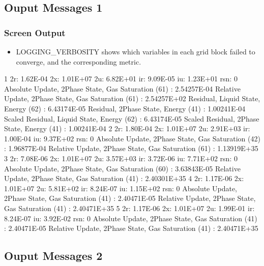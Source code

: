 \documentclass{beamer}
\newcommand\redcomment[1]{{{\color{red} #1}}}
\begin{document}
\subsection{Ouput Messages 1}

\begin{frame}[fragile]\frametitle{Screen Output}

\begin{itemize}
\item \redcomment{LOGGING\_VERBOSITY} shows which variables in each grid block failed to converge, and the corresponding metric. 
\end{itemize}

\begin{semiverbatim}
\tiny
1 2r: 1.62E-04 2x: 1.01E+07 2u: 6.82E+01 ir: 9.09E-05 iu: 1.23E+01 rsn:   0
   Absolute Update, 2Phase State, Gas Saturation (61) : 2.54257E-04
   Relative Update, 2Phase State, Gas Saturation (61) : 2.54257E+02
   Residual, Liquid State, Energy (62) : 6.43174E-05
   Residual, 2Phase State, Energy (41) : 1.00241E-04
   Scaled Residual, Liquid State, Energy (62) : 6.43174E-05
   Scaled Residual, 2Phase State, Energy (41) : 1.00241E-04
  2 2r: 1.80E-04 2x: 1.01E+07 2u: 2.91E+03 ir: 1.00E-04 iu: 9.37E+02 rsn:   0
   Absolute Update, 2Phase State, Gas Saturation (42) : 1.96877E-04
   Relative Update, 2Phase State, Gas Saturation (61) : 1.13919E+35
  3 2r: 7.08E-06 2x: 1.01E+07 2u: 3.57E+03 ir: 3.72E-06 iu: 7.71E+02 rsn:   0
   Absolute Update, 2Phase State, Gas Saturation (60) : 3.63843E-05
   Relative Update, 2Phase State, Gas Saturation (41) : 2.40301E+35
  4 2r: 1.17E-06 2x: 1.01E+07 2u: 5.81E+02 ir: 8.24E-07 iu: 1.15E+02 rsn:   0
   Absolute Update, 2Phase State, Gas Saturation (41) : 2.40471E-05
   Relative Update, 2Phase State, Gas Saturation (41) : 2.40471E+35
  5 2r: 1.17E-06 2x: 1.01E+07 2u: 1.99E-01 ir: 8.24E-07 iu: 3.92E-02 rsn:   0
   Absolute Update, 2Phase State, Gas Saturation (41) : 2.40471E-05
   Relative Update, 2Phase State, Gas Saturation (41) : 2.40471E+35

\end{semiverbatim}
\end{frame}

\subsection{Ouput Messages 2}
\end{document}
